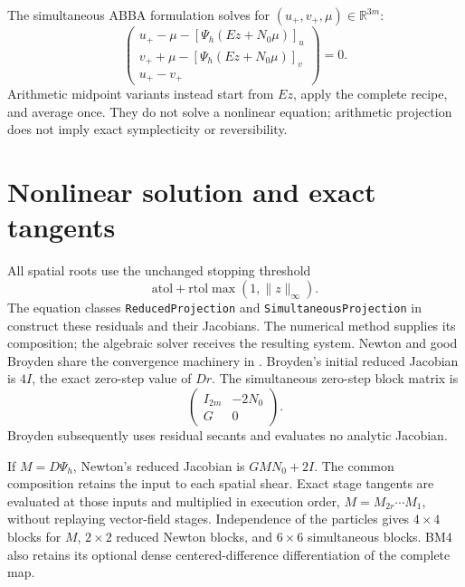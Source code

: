 \documentclass[11pt,a4paper]{article}
\newcommand{\R}{\mathbb{R}}
\begin{document}
The simultaneous ABBA formulation solves for $(u_+,v_+,\mu)\in\R^{3m}$:
\[
 \begin{pmatrix}
 u_+-\mu-[\Psi_h(Ez+N_0\mu)]_u\\
 v_++\mu-[\Psi_h(Ez+N_0\mu)]_v\\
 u_+-v_+
 \end{pmatrix}=0.
\]
Arithmetic midpoint variants instead start from $Ez$, apply the complete
recipe, and average once. They do not solve a nonlinear equation; arithmetic
projection does not imply exact symplecticity or reversibility.

\section{Nonlinear solution and exact tangents}
All spatial roots use the unchanged stopping threshold
\[
 \mathrm{atol}+\mathrm{rtol}\max(1,\|z\|_\infty).
\]
The equation classes \texttt{ReducedProjection} and
\texttt{SimultaneousProjection} in 
construct these residuals and their Jacobians. The numerical method supplies
its composition; the algebraic solver receives the resulting system.
Newton and good Broyden share the convergence machinery in
. Broyden's initial reduced
Jacobian is $4I$, the exact zero-step value of $Dr$. The simultaneous
zero-step block matrix is
\[
 \begin{pmatrix} I_{2m}&-2N_0\\G&0\end{pmatrix}.
\]
Broyden subsequently uses residual secants and evaluates no analytic
Jacobian.

If $M=D\Psi_h$, Newton's reduced Jacobian is $GMN_0+2I$. The common
composition retains the input to each spatial shear. Exact stage tangents
are evaluated at those inputs and multiplied in execution order,
$M=M_{2r}\cdots M_1$, without replaying vector-field stages.
Independence of the particles gives $4\times4$ blocks for $M$, $2\times2$
reduced Newton blocks, and $6\times6$ simultaneous blocks. BM4 also retains
its optional dense centered-difference differentiation of the complete map.
\end{document}
